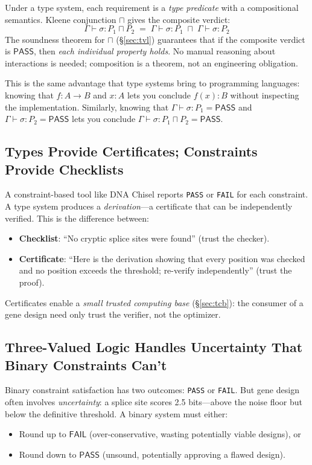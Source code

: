 \documentclass[runningheads]{llncs}
\newcommand{\PASS}{\ensuremath{\mathsf{PASS}}\xspace}
\newcommand{\FAIL}{\ensuremath{\mathsf{FAIL}}\xspace}
\newcommand{\tand}{\sqcap}
\newcommand{\seq}{\sigma}
\newcommand{\pred}{P}
\newcommand{\judg}[3]{#1 \vdash #2 : #3}
\begin{document}
Under a type system, each requirement is a \emph{type predicate} with a compositional semantics.
Kleene conjunction $\tand$ gives the composite verdict:
\[
  \judg{\Gamma}{\seq}{\pred_1 \tand \pred_2}
  \;=\;
  \judg{\Gamma}{\seq}{\pred_1} \;\tand\; \judg{\Gamma}{\seq}{\pred_2}
\]
The soundness theorem for $\tand$ (\S\ref{sec:tvl}) guarantees that if the composite verdict is \PASS, then \emph{each individual property holds}.
No manual reasoning about interactions is needed; composition is a theorem, not an engineering obligation.

This is the same advantage that type systems bring to programming languages: knowing that $f : A \to B$ and $x : A$ lets you conclude $f(x) : B$ without inspecting the implementation.
Similarly, knowing that $\judg{\Gamma}{\seq}{\pred_1} = \PASS$ and $\judg{\Gamma}{\seq}{\pred_2} = \PASS$ lets you conclude $\judg{\Gamma}{\seq}{\pred_1 \tand \pred_2} = \PASS$.

\subsection{Types Provide Certificates; Constraints Provide Checklists}

A constraint-based tool like DNA Chisel reports \texttt{PASS} or \texttt{FAIL} for each constraint.
A type system produces a \emph{derivation}---a certificate that can be independently verified.
This is the difference between:
\begin{itemize}[leftmargin=*,itemsep=0pt,topsep=1pt]
\item \textbf{Checklist}: ``No cryptic splice sites were found'' (trust the checker).
\item \textbf{Certificate}: ``Here is the derivation showing that every position was checked and no position exceeds the threshold; re-verify independently'' (trust the proof).
\end{itemize}

Certificates enable a \emph{small trusted computing base} (\S\ref{sec:tcb}): the consumer of a gene design need only trust the verifier, not the optimizer.

\subsection{Three-Valued Logic Handles Uncertainty That Binary Constraints Can't}

Binary constraint satisfaction has two outcomes: \texttt{PASS} or \texttt{FAIL}.
But gene design often involves \emph{uncertainty}: a splice site scores 2.5 bits---above the noise floor but below the definitive threshold.
A binary system must either:
\begin{itemize}[leftmargin=*,itemsep=0pt,topsep=1pt]
\item Round up to \FAIL{} (over-conservative, wasting potentially viable designs), or
\item Round down to \PASS{} (unsound, potentially approving a flawed design).
\end{itemize}
\end{document}
